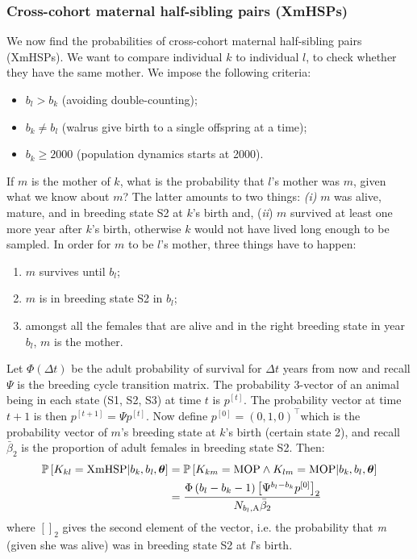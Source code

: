 \subsubsection{Cross-cohort maternal half-sibling pairs (XmHSPs)}

We now find the probabilities of cross-cohort maternal half-sibling
pairs (XmHSPs). We want to compare individual \emph{$k$} to individual
\emph{$l$}, to check whether they have the same mother. We impose
the following criteria:
\begin{itemize}
\item $b_{l}>b_{k}$ (avoiding double-counting);
\item $b_{k}\neq b_{l}$ (walrus give birth to a single offspring at a time);
\item $b_{k}\geqslant2000$ (population dynamics starts at 2000).
\end{itemize}
If \emph{$m$} is the mother of $k$, what is the probability that
$l$'s mother was $m$, given what we know about $m$? The latter
amounts to two things:\emph{ }\textit{\emph{(}}\emph{i}\textit{\emph{)
}}\emph{$m$} was alive, mature, and in breeding state S2 at $k$'s
birth and, (\textit{ii}) \emph{$m$} survived at least one more year
after\emph{ }$k$'s birth, otherwise \emph{$k$} would not have lived
long enough to be sampled. In order for \emph{$m$} to be $l$'s mother,
three things have to happen:
\begin{enumerate}
\item $m$ survives until $b_{l}$;
\item $m$ is in breeding state S2 in $b_{l}$;
\item amongst all the females that are alive and in the right breeding state
in year $b_{l}$, $m$ is the mother.
\end{enumerate}
Let $\Phi\left(\Delta t\right)$ be the adult probability of survival
for $\Delta t$ years from \textquotedbl now\textquotedbl{} and recall
$\Psi$ is the breeding cycle transition matrix. The probability 3-vector
of an animal being in each state (S1, S2, S3) at time $t$ is $p^{\left[t\right]}$.
The probability vector at time $t+1$ is then $p^{\left[t+1\right]}=\Psi p^{\left[t\right]}$.
Now define $p^{\left[0\right]}=\left(0,1,0\right)^{\top}$which is
the probability vector of \emph{$m$}'s breeding state at $k$'s birth
(certain state 2), and recall $\bar{\beta}_{2}$ is the proportion
of adult females in breeding state S2. Then:
\begin{align}
\mathbb{P}\left[K_{kl}=\text{XmHSP}\vert b_{\text{\emph{k}}},b_{\text{\emph{l}}},\boldsymbol{\theta}\right] & =\mathbb{P}\left[K_{km}=\text{MOP}\wedge K_{lm}=\text{MOP}\vert b_{\text{\emph{k}}},b_{l},\boldsymbol{\theta}\right]\nonumber \\
 & =\frac{\Phi\left(b_{l}-b_{k}-1\right)\left[\Psi^{b_{l}-b_{k}}p^{\left[0\right]}\right]_{2}}{N_{b_{l},\text{A}}\bar{\beta}_{2}}\label{eq:xmhsp}
\end{align}
where $\left[\right]_{2}$ gives the second element of the vector,
i.e. the probability that \textit{m} (given she was alive) was in
breeding state S2 at \textit{l}'s birth.


